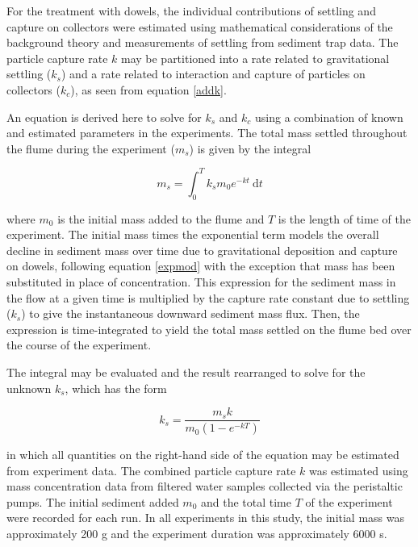 \documentclass[12pt]{article}
\begin{document}
For the treatment with dowels, the individual contributions of settling and capture on collectors were estimated using mathematical considerations of the background theory and measurements of settling from sediment trap data. The particle capture rate $k$ may be partitioned into a rate related to gravitational settling ($k_s$) and a rate related to interaction and capture of particles on collectors ($k_c$), as seen from equation \ref{addk}.

An equation is derived here to solve for $k_s$ and $k_c$ using a combination of known and estimated parameters in the experiments. The total mass settled throughout the flume during the experiment ($m_s$) is given by the integral

\begin{equation} \label{ms_integral}
    m_s=\int_0^T k_s m_0 e^{-kt} \ \text{d}t
\end{equation}

\noindent where $m_0$ is the initial mass added to the flume and $T$ is the length of time of the experiment. The initial mass times the exponential term models the overall decline in sediment mass over time due to gravitational deposition and capture on dowels, following equation \ref{expmod} with the exception that mass has been substituted in place of concentration. This expression for the sediment mass in the flow at a given time is multiplied by the capture rate constant due to settling ($k_s$) to give the instantaneous downward sediment mass flux. Then, the expression is time-integrated to yield the total mass settled on the flume bed over the course of the experiment.

The integral may be evaluated and the result rearranged to solve for the unknown $k_s$, which has the form

\begin{equation} \label{ks_solved}
    k_s=\frac{m_s k}{m_0 (1-e^{-kT})}
\end{equation}

\noindent in which all quantities on the right-hand side of the equation may be estimated from experiment data. The combined particle capture rate $k$ was estimated using mass concentration data from filtered water samples collected via the peristaltic pumps. The initial sediment added $m_0$ and the total time $T$ of the experiment were recorded for each run. In all experiments in this study, the initial mass was approximately 200 g and the experiment duration was approximately 6000 s.
\end{document}
